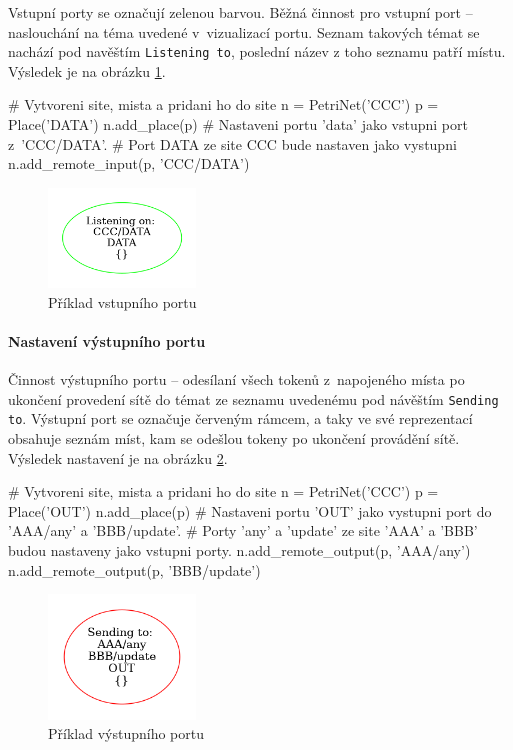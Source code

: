 Vstupní porty se označují zelenou barvou. Běžná činnost pro vstupní port -- naslouchání na téma uvedené v~vizualizací portu. Seznam takových témat se nachází pod navěštím \texttt{Listening to}, poslední název z toho seznamu patří místu. Výsledek je na obrázku \ref{port-in}.

\begin{python}
  # Vytvoreni site, mista a pridani ho do site
  n = PetriNet('CCC')
  p = Place('DATA')
  n.add_place(p)
  # Nastaveni portu 'data' jako vstupni port z~'CCC/DATA'.
  # Port DATA ze site CCC bude nastaven jako vystupni
  n.add_remote_input(p, 'CCC/DATA')
\end{python}


\begin{figure}[hbt]
 \centering
 \includegraphics[width=0.35\textwidth]{obrazky-figures/port-in.png}
 \caption{Příklad vstupního portu}
 \label{port-in}
\end{figure}

\paragraph{Nastavení výstupního portu}

Činnost výstupního portu -- odesílaní všech tokenů z~napojeného místa po ukončení provedení sítě do témat ze seznamu uvedenému pod návěštím \texttt{Sending to}. Výstupní port se označuje červeným rámcem, a taky ve své reprezentací obsahuje seznám míst, kam se odešlou tokeny po ukončení provádění sítě. Výsledek nastavení je na obrázku \ref{port-out}.

\begin{python}
  # Vytvoreni site, mista a pridani ho do site
  n = PetriNet('CCC')
  p = Place('OUT')
  n.add_place(p)
  # Nastaveni portu 'OUT' jako vystupni port do 'AAA/any' a 'BBB/update'.
  # Porty 'any' a 'update' ze site 'AAA' a 'BBB' budou nastaveny jako vstupni porty.
  n.add_remote_output(p, 'AAA/any')
  n.add_remote_output(p, 'BBB/update')
\end{python}


\begin{figure}[hbt]
  \centering
  \includegraphics[width=0.35\textwidth]{obrazky-figures/port-out.png}
  \caption{Příklad výstupního portu}
  \label{port-out}
\end{figure}


